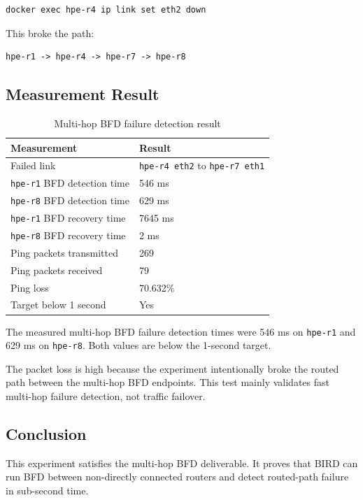 \begin{verbatim}
docker exec hpe-r4 ip link set eth2 down
\end{verbatim}

This broke the path:

\begin{verbatim}
hpe-r1 -> hpe-r4 -> hpe-r7 -> hpe-r8
\end{verbatim}

\subsection{Measurement Result}

\begin{table}[H]
\centering
\small
\renewcommand{\arraystretch}{1.25}
\begin{tabular}{|p{6cm}|p{5cm}|}
\hline
\textbf{Measurement} & \textbf{Result} \\
\hline
Failed link & \texttt{hpe-r4 eth2} to \texttt{hpe-r7 eth1} \\
\hline
\texttt{hpe-r1} BFD detection time & 546 ms \\
\hline
\texttt{hpe-r8} BFD detection time & 629 ms \\
\hline
\texttt{hpe-r1} BFD recovery time & 7645 ms \\
\hline
\texttt{hpe-r8} BFD recovery time & 2 ms \\
\hline
Ping packets transmitted & 269 \\
\hline
Ping packets received & 79 \\
\hline
Ping loss & 70.632\% \\
\hline
Target below 1 second & Yes \\
\hline
\end{tabular}
\caption{Multi-hop BFD failure detection result}
\end{table}

The measured multi-hop BFD failure detection times were 546 ms on \texttt{hpe-r1} and 629 ms on \texttt{hpe-r8}. Both values are below the 1-second target.

The packet loss is high because the experiment intentionally broke the routed path between the multi-hop BFD endpoints. This test mainly validates fast multi-hop failure detection, not traffic failover.

\subsection{Conclusion}

This experiment satisfies the multi-hop BFD deliverable. It proves that BIRD can run BFD between non-directly connected routers and detect routed-path failure in sub-second time.
